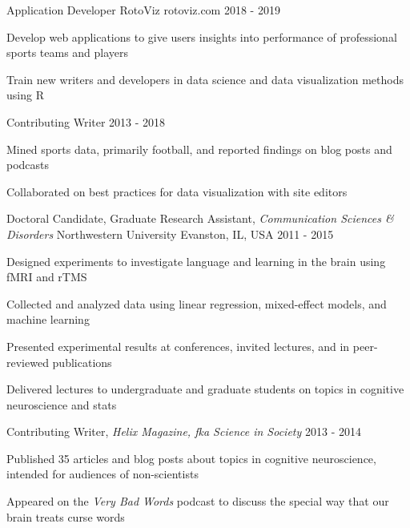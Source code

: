 \begin{cventries}
 \cventry
    {Application Developer}
    {RotoViz}
    {rotoviz.com}
    {2018 - 2019}
    {
     \begin{cvitems}
       \item {Develop web applications to give users insights into performance of professional sports teams and players}
       \item {Train new writers and developers in data science and data visualization methods using R}
     \end{cvitems}
   }
   
   \cventry
   {Contributing Writer}
   {}
   {}
   {2013 - 2018}
   {
      \begin{cvitems}
       \item {Mined sports data, primarily football, and reported findings on blog posts and podcasts}
       \item {Collaborated on best practices for data visualization with site editors}
      \end{cvitems}
    }

 \cventry
    {Doctoral Candidate, Graduate Research Assistant, \textit{Communication Sciences \& Disorders}} %
    {Northwestern University} %
    {Evanston, IL, USA} %
    {2011 - 2015} %
   {
    \begin{cvitems}
    \item {Designed experiments to investigate language and learning in the brain using fMRI and rTMS}
    \item {Collected and analyzed data using linear regression, mixed-effect models, and machine learning}
    \item {Presented experimental results at conferences, invited lectures, and in peer-reviewed publications} 
    \item {Delivered lectures to undergraduate and graduate students on topics in cognitive neuroscience and stats} 
    \end{cvitems}
    }
    
   \cventry
    {Contributing Writer, \textit{Helix Magazine, fka Science in Society}}
    {}
    {}
    {2013 - 2014}
    {
      \begin{cvitems}
      \item {Published 35 articles and blog posts about topics in cognitive neuroscience, intended for audiences of non-scientists}
      \item {Appeared on the \textit{Very Bad Words} podcast to discuss the special way that our brain treats curse words}
      \end{cvitems}
    }


\end{cventries}
